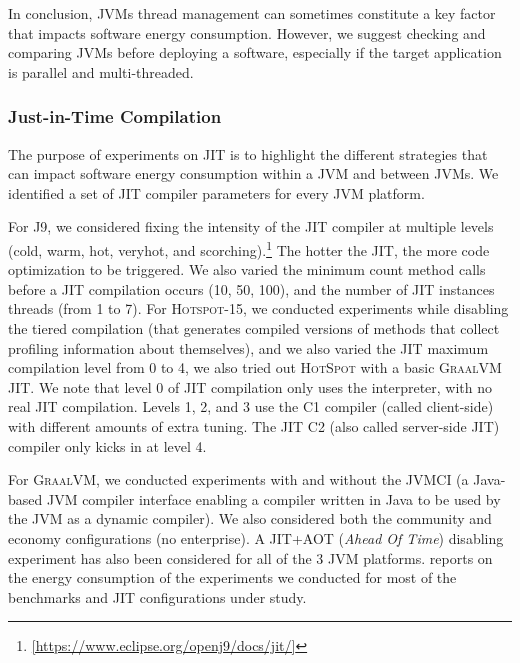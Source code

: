 In conclusion, JVMs thread management can sometimes constitute a key factor that impacts software energy consumption.
However, we suggest checking and comparing JVMs before deploying a software, especially if the target application is parallel and multi-threaded.


\subsubsection{Just-in-Time Compilation}
The purpose of experiments on JIT is to highlight the different strategies that can impact software energy consumption within a JVM and between JVMs.
We identified a set of JIT compiler parameters for every JVM platform.

For \textsc{J9}, we considered fixing the intensity of the JIT compiler at multiple levels (\textsf{cold}, \textsf{warm}, \textsf{hot}, \textsf{veryhot}, and \textsf{scorching}).\footnote{\url{[https://www.eclipse.org/openj9/docs/jit/]}}
The hotter the JIT, the more code optimization to be triggered.
We also varied the minimum count method calls before a JIT compilation occurs (\textsf{10}, \textsf{50}, \textsf{100}), and the number of JIT instances threads (from \textsf{1} to \textsf{7}).
For \textsc{Hotspot-15}, we conducted experiments while disabling the tiered compilation (that generates compiled versions of methods that collect profiling information about themselves), and we also varied the JIT maximum compilation level from \textsf{0} to \textsf{4}, we also tried out \textsc{HotSpot} with a basic \textsc{GraalVM} JIT.
We note that level 0 of JIT compilation only uses the interpreter, with no real JIT compilation.
Levels 1, 2, and 3 use the C1 compiler (called client-side) with different amounts of extra tuning.
The JIT C2 (also called server-side JIT) compiler only kicks in at level 4.

For \textsc{GraalVM}, we conducted experiments with and without the JVMCI (a Java-based JVM compiler interface enabling a compiler written in Java to be used by the JVM as a dynamic compiler).
We also considered both the community and economy configurations (no enterprise).
A JIT+AOT (\emph{Ahead Of Time}) disabling experiment has also been considered for all of the 3 JVM platforms.
 reports on the energy consumption of the experiments we conducted for most of the benchmarks and JIT configurations under study.



